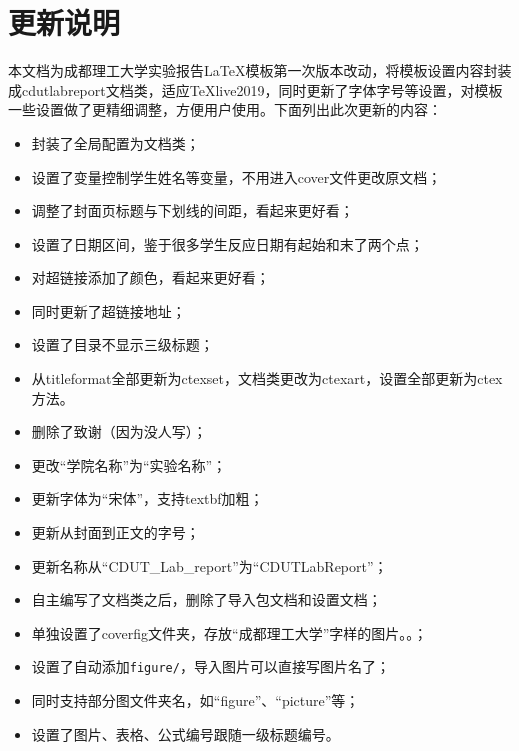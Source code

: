 \section{更新说明}
本文档为成都理工大学实验报告\LaTeX{}模板第一次版本改动，将模板设置内容封装成cdutlabreport文档类，适应TeXlive2019，同时更新了字体字号等设置，对模板一些设置做了更精细调整，方便用户使用。下面列出此次更新的内容：
\begin{itemize}
	\item 封装了全局配置为文档类；
	\item 设置了变量控制学生姓名等变量，不用进入cover文件更改原文档；
	\item 调整了封面页标题与下划线的间距，看起来更好看；
	\item 设置了日期区间，鉴于很多学生反应日期有起始和末了两个点；
	\item 对超链接添加了颜色，看起来更好看；
	\item 同时更新了超链接地址；
	\item 设置了目录不显示三级标题；
	\item 从titleformat全部更新为ctexset，文档类更改为ctexart，设置全部更新为ctex方法。
	\item 删除了致谢（因为没人写）；
	\item 更改“学院名称”为“实验名称”；
	\item 更新字体为“宋体”，支持textbf加粗；
	\item 更新从封面到正文的字号；
	\item 更新名称从“CDUT\_Lab\_report”为“CDUTLabReport”；
	\item 自主编写了文档类之后，删除了导入包文档和设置文档；
	\item 单独设置了coverfig文件夹，存放“成都理工大学”字样的图片。。；
	\item 设置了自动添加\verb|figure/|，导入图片可以直接写图片名了；
	\item 同时支持部分图文件夹名，如“figure”、“picture”等；
	\item 设置了图片、表格、公式编号跟随一级标题编号。
\end{itemize}
